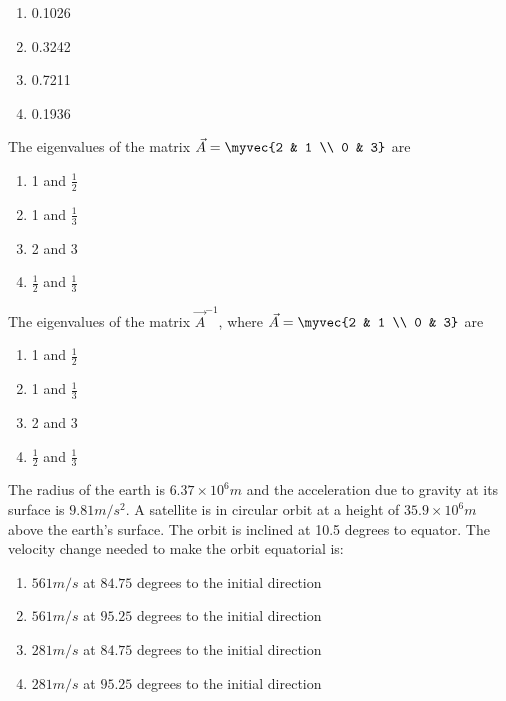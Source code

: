 \begin{multicols}{4}
    \begin{enumerate}
        \item 0.1026
        \item 0.3242
        \item 0.7211
        \item 0.1936
    \end{enumerate}
\end{multicols}

\item The eigenvalues of the matrix $\vec{A} = \myvec{2 & 1 \\ 0 & 3}$ are

\begin{multicols}{4}
    \begin{enumerate}
        \item 1 and $\frac{1}{2}$
        \item 1 and $\frac{1}{3}$
        \item 2 and 3
        \item $\frac{1}{2}$ and $\frac{1}{3}$
    \end{enumerate}
\end{multicols}

\item The eigenvalues of the matrix $\vec{A}^{-1}$, where $\vec{A} = \myvec{2 & 1 \\ 0 & 3}$ are

\begin{multicols}{4}
    \begin{enumerate}
        \item 1 and $\frac{1}{2}$
        \item 1 and $\frac{1}{3}$
        \item 2 and 3
        \item $\frac{1}{2}$ and $\frac{1}{3}$
    \end{enumerate}
\end{multicols}

\item The radius of the earth is $6.37 \times 10^6 m$ and the acceleration due to gravity
at its surface is $9.81 m/s^2$. A satellite is in circular orbit at a height of
$35.9 \times 10^6 m$ above the earth's surface. The orbit is inclined at 10.5 degrees to
equator. The velocity change needed to make the orbit equatorial is:

\begin{enumerate}
    \item $561 m/s$ at $84.75$ degrees to the initial direction
    \item $561 m/s$ at $95.25$ degrees to the initial direction
    \item $281 m/s$ at $84.75$ degrees to the initial direction
    \item $281 m/s$ at $95.25$ degrees to the initial direction
\end{enumerate}

